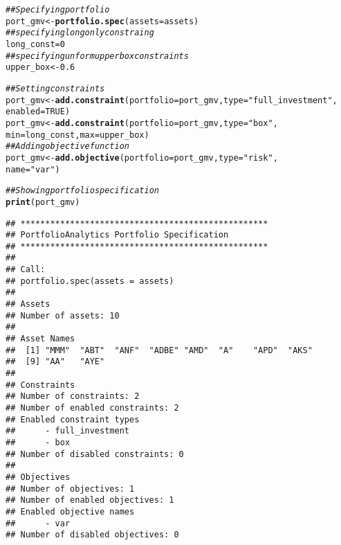 \documentclass[12pt,letterpaper,english]{article}\usepackage[]{graphicx}\usepackage[]{color}
\makeatletter
\newcommand{\hlnum}[1]{\textcolor[rgb]{0.686,0.059,0.569}{#1}}%
\newcommand{\hlstr}[1]{\textcolor[rgb]{0.192,0.494,0.8}{#1}}%
\newcommand{\hlcom}[1]{\textcolor[rgb]{0.678,0.584,0.686}{\textit{#1}}}%
\newcommand{\hlstd}[1]{\textcolor[rgb]{0.345,0.345,0.345}{#1}}%
\newcommand{\hlkwb}[1]{\textcolor[rgb]{0.69,0.353,0.396}{#1}}%
\newcommand{\hlkwc}[1]{\textcolor[rgb]{0.333,0.667,0.333}{#1}}%
\newcommand{\hlkwd}[1]{\textcolor[rgb]{0.737,0.353,0.396}{\textbf{#1}}}%
\newenvironment{kframe}{%
 \def\at@end@of@kframe{}%
 \ifinner\ifhmode%
  \def\at@end@of@kframe{\end{minipage}}%
  \begin{minipage}{\columnwidth}%
 \fi\fi%
 \def\FrameCommand##1{\hskip\@totalleftmargin \hskip-\fboxsep
 \colorbox{shadecolor}{##1}\hskip-\fboxsep
     \hskip-\linewidth \hskip-\@totalleftmargin \hskip\columnwidth}%
 \MakeFramed {\advance\hsize-\width
   \@totalleftmargin\z@ \linewidth\hsize
   \@setminipage}}%
 {\par\unskip\endMakeFramed%
 \at@end@of@kframe}
\newenvironment{knitrout}{}{} %
\makeatother
\begin{document}
\begin{knitrout}
\color{fgcolor}\begin{kframe}
\begin{alltt}
\hlcom{## Specifying portfolio}
\hlstd{port_gmv} \hlkwb{<-} \hlkwd{portfolio.spec}\hlstd{(}\hlkwc{assets} \hlstd{= assets)}
\hlcom{## specifying long only constraing}
\hlstd{long_const} \hlkwb{=} \hlnum{0}
\hlcom{## specifying unform upper box constraints}
\hlstd{upper_box} \hlkwb{<-} \hlnum{0.6}

\hlcom{## Setting constraints}
\hlstd{port_gmv} \hlkwb{<-} \hlkwd{add.constraint}\hlstd{(}\hlkwc{portfolio} \hlstd{= port_gmv,} \hlkwc{type} \hlstd{=} \hlstr{"full_investment"}\hlstd{,}
    \hlkwc{enabled} \hlstd{=} \hlnum{TRUE}\hlstd{)}
\hlstd{port_gmv} \hlkwb{<-} \hlkwd{add.constraint}\hlstd{(}\hlkwc{portfolio} \hlstd{= port_gmv,} \hlkwc{type} \hlstd{=} \hlstr{"box"}\hlstd{,}
    \hlkwc{min} \hlstd{= long_const,} \hlkwc{max} \hlstd{= upper_box)}
\hlcom{## Adding objective function}
\hlstd{port_gmv} \hlkwb{<-} \hlkwd{add.objective}\hlstd{(}\hlkwc{portfolio} \hlstd{= port_gmv,} \hlkwc{type} \hlstd{=} \hlstr{"risk"}\hlstd{,}
    \hlkwc{name} \hlstd{=} \hlstr{"var"}\hlstd{)}

\hlcom{## Showing portfolio specification}
\hlkwd{print}\hlstd{(port_gmv)}
\end{alltt}
\begin{verbatim}
## **************************************************
## PortfolioAnalytics Portfolio Specification 
## **************************************************
## 
## Call:
## portfolio.spec(assets = assets)
## 
## Assets
## Number of assets: 10 
## 
## Asset Names
##  [1] "MMM"  "ABT"  "ANF"  "ADBE" "AMD"  "A"    "APD"  "AKS" 
##  [9] "AA"   "AYE" 
## 
## Constraints
## Number of constraints: 2 
## Number of enabled constraints: 2 
## Enabled constraint types
## 		- full_investment 
## 		- box 
## Number of disabled constraints: 0 
## 
## Objectives
## Number of objectives: 1 
## Number of enabled objectives: 1 
## Enabled objective names
## 		- var 
## Number of disabled objectives: 0
\end{verbatim}
\end{kframe}
\end{knitrout}
\end{document}
